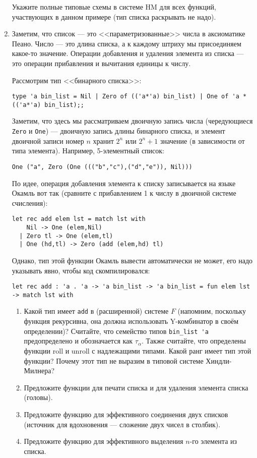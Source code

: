 \documentclass[10pt,a4paper,oneside]{article}
\begin{document}
\begin{enumerate}
Укажите полные типовые схемы в системе HM для всех функций, участвующих в данном примере (тип списка раскрывать не надо).

\item Заметим, что список --- это <<параметризованные>> числа в 
аксиоматике Пеано. Число --- это длина списка, а к каждому штриху мы присоединяем какое-то значение.
Операции добавления и удаления элемента из списка --- это операции прибавления и вычитания
единицы к числу.

Рассмотрим тип <<бинарного списка>>:

\begin{verbatim}
type 'a bin_list = Nil | Zero of (('a*'a) bin_list) | One of 'a * (('a*'a) bin_list);;
\end{verbatim}

Заметим, что здесь мы рассматриваем двоичную запись числа (чередующиеся \verb!Zero! и \verb!One!) ---
двоичную запись длины бинарного списка, и элемент двоичной записи номер $n$ хранит $2^n$ или $2^n+1$ 
значение (в зависимости от типа элемента). Например, 5-элементный список:

\begin{verbatim}
One ("a", Zero (One ((("b","c"),("d","e")), Nil)))
\end{verbatim}

По идее, операция добавления элемента к списку записывается на языке Окамль вот так 
(сравните с прибавлением 1 к числу в двоичной системе счисления):

\begin{verbatim}
let rec add elem lst = match lst with
    Nil -> One (elem,Nil)
  | Zero tl -> One (elem,tl)
  | One (hd,tl) -> Zero (add (elem,hd) tl)
\end{verbatim}

Однако, тип этой функции Окамль вывести автоматически не может, его надо указывать явно,
чтобы код скомпилировался:

\begin{verbatim}
let rec add : 'a . 'a -> 'a bin_list -> 'a bin_list = fun elem lst -> match lst with
\end{verbatim}

\begin{enumerate}
\item Какой тип имеет \verb!add! в (расширенной) системе $F$ (напомним, поскольку функция рекурсивна,
она должна использовать Y-комбинатор в своём определении)?
Считайте, что семейство типов \verb!bin_list 'a! предопределено и обозначается как $\tau_\alpha$.
Также считайте, что определены функции roll и unroll с надлежащими типами.
Какой ранг имеет тип этой функции? Почему этот тип не выразим в типовой системе Хиндли-Милнера?
\item Предложите функции для печати списка и для удаления элемента списка (головы).
\item Предложите функцию для эффективного соединения двух списков (источник для 
вдохновения --- сложение двух чисел в столбик).
\item Предложите функцию для эффективного выделения $n$-го элемента из списка.
\end{enumerate}


\end{enumerate}
\end{document}
